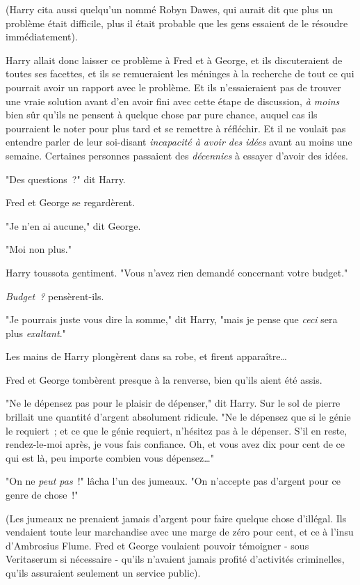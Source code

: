 (Harry cita aussi quelqu'un nommé Robyn Dawes, qui aurait dit que plus un problème était difficile, plus il était probable que les gens essaient de le résoudre immédiatement).

Harry allait donc laisser ce problème à Fred et à George, et ils discuteraient de toutes ses facettes, et ils se remueraient les méninges à la recherche de tout ce qui pourrait avoir un rapport avec le problème. Et ils n'essaieraient pas de trouver une vraie solution avant d'en avoir fini avec cette étape de discussion, \emph{à moins} bien sûr qu'ils ne pensent à quelque chose par pure chance, auquel cas ils pourraient le noter pour plus tard et se remettre à réfléchir. Et il ne voulait pas entendre parler de leur soi-disant \emph{incapacité à avoir des idées} avant au moins une semaine. Certaines personnes passaient des \emph{décennies} à essayer d'avoir des idées.

"Des questions~?" dit Harry.

Fred et George se regardèrent.

"Je n'en ai aucune," dit George.

"Moi non plus."

Harry toussota gentiment. "Vous n'avez rien demandé concernant votre budget."

\emph{Budget~?} pensèrent-ils.

"Je pourrais juste vous dire la somme," dit Harry, "mais je pense que \emph{ceci} sera plus \emph{exaltant}."

Les mains de Harry plongèrent dans sa robe, et firent apparaître…

Fred et George tombèrent presque à la renverse, bien qu'ils aient été assis.

"Ne le dépensez pas pour le plaisir de dépenser," dit Harry. Sur le sol de pierre brillait une quantité d'argent absolument ridicule. "Ne le dépensez que si le génie le requiert~; et ce que le génie requiert, n'hésitez pas à le dépenser. S'il en reste, rendez-le-moi après, je vous fais confiance. Oh, et vous avez dix pour cent de ce qui est là, peu importe combien vous dépensez…"

"On ne \emph{peut pas}~!" lâcha l'un des jumeaux. "On n'accepte pas d'argent pour ce genre de chose~!"

(Les jumeaux ne prenaient jamais d'argent pour faire quelque chose d'illégal. Ils vendaient toute leur marchandise avec une marge de zéro pour cent, et ce à l'insu d'Ambrosius Flume. Fred et George voulaient pouvoir témoigner - sous Veritaserum si nécessaire - qu'ils n'avaient jamais profité d'activités criminelles, qu'ils assuraient seulement un service public).

